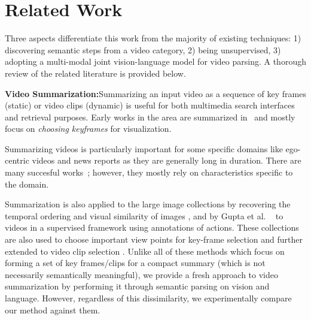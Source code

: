 \section{Related Work}
Three aspects differentiate this work from the majority of existing techniques: 1) discovering semantic steps from a video category, 2) being unsupervised, 3) adopting a multi-modal joint vision-language model for video parsing. A thorough review of the related literature is provided below.

\noindent\textbf{Video Summarization:}Summarizing an input video as a sequence of key frames (static) or video clips (dynamic) is useful for both multimedia search interfaces and retrieval purposes. Early works in the area are summarized in~\cite{vidAbstraction} and mostly focus on \emph{choosing keyframes} for visualization.

Summarizing videos is particularly important for some specific domains like ego-centric videos and news reports as they are generally long in duration. There are many succesful works~\cite{lee2012discovering, lu2013story,rui2000automatically}; however, they mostly rely on characteristics specific to the domain.

Summarization is also applied to the large image collections by recovering the temporal ordering and visual similarity of images \cite{storyGraph}, and by Gupta et al. ~\cite{gupta2009understanding} to videos in a supervised framework using annotations of actions. These collections are also used to choose important view points for key-frame selection \cite{khosla2013large} and further extended to video clip selection \cite{kim2014joint,potapov2014category}. Unlike all of these methods which  focus on forming a set of key frames/clips for a compact summary (which is not necessarily semantically meaningful), we provide a fresh approach to video summarization by performing it through semantic parsing on vision and language. However, regardless of this dissimilarity, we experimentally compare our method against them.

